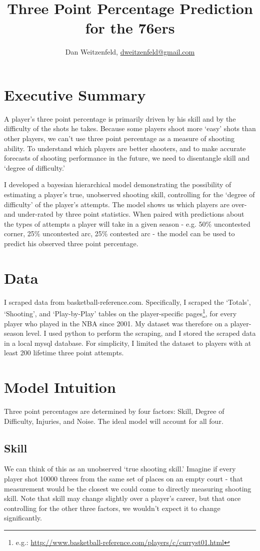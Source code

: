 \documentclass[11pt, oneside]{article}   	%
\title{Three Point Percentage Prediction for the 76ers}
\author{Dan Weitzenfeld, \href{mailto:dweitzenfeld@gmail.com}{dweitzenfeld@gmail.com}}
\date{}							%
\begin{document}
\maketitle

\section{Executive Summary}

A player's three point percentage is primarily driven by his skill and by the difficulty of the shots he takes.  Because some players shoot more `easy' shots than other players, we can't use three point percentage as a measure of shooting ability.  To understand which players are better shooters, and to make accurate forecasts of shooting performance in the future, we need to disentangle skill and `degree of difficulty.'

I developed a bayesian hierarchical model demonstrating the possibility of estimating a player's true, unobserved shooting skill, controlling for the `degree of difficulty' of the player's attempts.  The model shows us which players are over- and under-rated by three point statistics.  When paired with predictions about the types of attempts a player will take in a given season - e.g. 50\% uncontested corner, 25\% uncontested arc, 25\% contested arc - the model can be used to predict his observed three point percentage.  

\section{Data}
I scraped data from basketball-reference.com.  Specifically, I scraped the `Totals', `Shooting', and `Play-by-Play' tables on the player-specific pages\footnote{e.g.: \url{http://www.basketball-reference.com/players/c/curryst01.html}}, for every player who played in the NBA since 2001.  My dataset was therefore on a player-season level.  I used python to perform the scraping, and I stored the scraped data in a local mysql database.  
For simplicity, I limited the dataset to players with at least 200 lifetime three point attempts.
\section{Model Intuition}
Three point percentages are determined by four factors: Skill, Degree of Difficulty, Injuries, and Noise.  The ideal model will account for all four.  

\subsection{Skill}
We can think of this as an unobserved `true shooting skill.'  Imagine if every player shot 10000 threes from the same set of places on an empty court - that measurement would be the closest we could come to directly measuring shooting skill.  Note that skill may change slightly over a player's career, but that once controlling for the other three factors, we wouldn't expect it to change significantly. 
\end{document}
